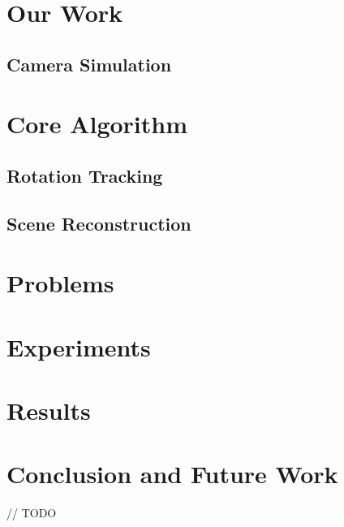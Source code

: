 \documentclass[10pt,twocolumn,letterpaper]{article}
\begin{document}
\section{Our Work}
\label{sec:our_work}


\subsection{Camera Simulation}
\label{sec:simulation}



\section{Core Algorithm}
\label{sec:core_algorithm}


\subsection{Rotation Tracking}
\label{sec:tracking}


\subsection{Scene Reconstruction}
\label{sec:scene_reconstruction}



\section{Problems}
\label{sec:problems}



\section{Experiments}
\label{sec:experiments}



\section{Results}
\label{sec:results}


\section{Conclusion and Future Work}
\label{sec:conclusion}
// TODO


{\small


}
\end{document}
